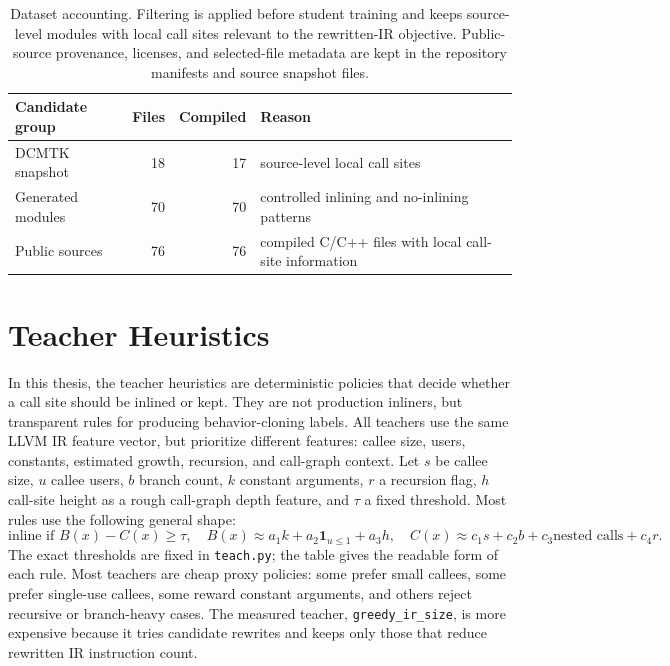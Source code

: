 \documentclass[12pt, a4paper]{report}
\begin{document}
\begin{table}[H]
\centering
{\footnotesize
\setlength{\tabcolsep}{3pt}
\begin{tabular}{|p{}|r|r|p{}|}
\hline
Candidate group & Files & Compiled & Reason \\
\hline
DCMTK snapshot & 18 & 17 & source-level local call sites \\
\hline
Generated modules & 70 & 70 & controlled inlining and no-inlining
patterns \\
\hline
Public sources & 76 & 76 & compiled C/C++ files with local call-site
information \\
\hline
\end{tabular}
}
\caption{Dataset accounting. Filtering is applied before student training and
keeps source-level modules with local call sites relevant to the rewritten-IR
objective. Public-source provenance, licenses, and selected-file metadata are
kept in the repository manifests and source snapshot files.}
\label{tab:dataset-accounting}
\end{table}

\section{Teacher Heuristics}

In this thesis, the teacher heuristics are deterministic policies that decide
whether a call site should be inlined or kept. They are not production inliners,
but transparent rules for producing behavior-cloning labels. All teachers use
the same LLVM IR feature vector, but prioritize different features: callee size,
users, constants, estimated growth, recursion, and call-graph context. Let \(s\)
be callee size, \(u\) callee users, \(b\) branch count, \(k\) constant arguments,
\(r\) a recursion flag, \(h\) call-site height as a rough call-graph depth
feature, and \(\tau\) a fixed threshold. Most rules use the following general
shape:
\[
  \text{inline if } B(x)-C(x)\ge \tau,\quad
  B(x)\approx a_1k+a_2\mathbf{1}_{u\le1}+a_3h,\quad
  C(x)\approx c_1s+c_2b+c_3\text{nested calls}+c_4r .
\]
The exact thresholds are fixed in \texttt{teach.py}; the table gives the
readable form of each rule. Most teachers are cheap proxy policies: some prefer
small callees, some prefer single-use callees, some reward constant arguments,
and others reject recursive or branch-heavy cases. The measured teacher,
\texttt{greedy\_ir\_size}, is more expensive because it tries candidate rewrites
and keeps only those that reduce rewritten IR instruction count.
\end{document}

